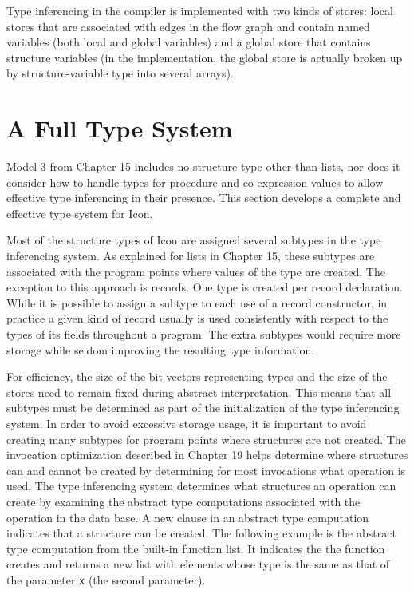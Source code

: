 Type inferencing in the compiler is implemented with two kinds of
stores: local stores that are associated with edges in the flow graph
and contain named variables (both local and global variables) and a
global store that contains structure variables (in the implementation,
the global store is actually broken up by structure-variable type into
several arrays).


\section{A Full Type System}

Model 3 from Chapter 15 includes no structure type other than lists,
nor does it consider how to handle types for procedure and
co-expression values to allow effective type inferencing in their
presence. This section develops a complete and effective type system
for Icon.

Most of the structure types of Icon are assigned several subtypes in
the type inferencing system. As explained for lists in Chapter 15,
these subtypes are associated with the program points where values of
the type are created. The exception to this approach is records. One
type is created per record declaration. While it is possible to assign
a subtype to each use of a record constructor, in practice a given
kind of record usually is used consistently with respect to the types
of its fields throughout a program. The extra subtypes would require
more storage while seldom improving the resulting type information.

For efficiency, the size of the bit vectors representing types and the
size of the stores need to remain fixed during abstract
interpretation. This means that all subtypes must be determined as
part of the initialization of the type inferencing system. In order to
avoid excessive storage usage, it is important to avoid creating many
subtypes for program points where structures are not created. The
invocation optimization described in Chapter 19 helps determine where
structures can and cannot be created by determining for most
invocations what operation is used. The type inferencing system
determines what structures an operation can create by examining the
abstract type computations associated with the operation in the data
base. A new clause in an abstract type computation indicates that a
structure can be created. The following example is the abstract type
computation from the built-in function list. It indicates the the
function creates and returns a new list with elements whose type is
the same as that of the parameter \texttt{x} (the second parameter).

